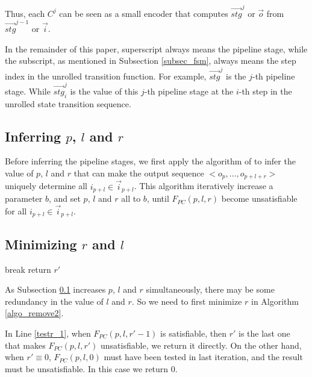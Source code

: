 \documentclass[runningheads,a4paper,orivec]{llncs}
\begin{document}
Thus,
each $C^j$ can be seen as a small encoder that computes $\vec{stg}^j$ or $\vec{o}$
from $\vec{stg}^{j-1}$ or $\vec{i}$.

In the remainder of this paper,
superscript always means the pipeline stage,
while the subscript,
as mentioned in Subsection \ref{subsec_fsm},
always means the step index in the unrolled transition function.
For example,
$\vec{stg}^j$ is the $j$-th pipeline stage.
While $\vec{stg}^j_i$ is the value of this $j$-th pipeline stage 
at the $i$-th step in the unrolled state transition sequence.

\subsection{Inferring $p$, $l$ and $r$}\label{subsec_inferplr}
Before inferring the pipeline stages,
we first apply the algorithm of \cite{ShenTCAD11} to infer the value of $p$, $l$ and $r$ that can make the 
output sequence $<o_{p},\dots,o_{p+l+r}>$ uniquely determine all $i_{p+l}\in \vec{i}_{p+l}$.
This algorithm iteratively increase a parameter $b$,
and set $p$, $l$ and $r$ all to $b$,
until $F_{PC}(p,l,r)$ become unsatisfiable for all $i_{p+l}\in \vec{i}_{p+l}$.

\subsection{Minimizing $r$ and $l$}\label{reduceing}

\begin{algorithm}[t]
\SetAlgoVlined
{} {
   {
    break
  }
}
return $r'$
\caption{$RemoveRedundancy(p,l,r)$}
\label{algo_remove2}
\end{algorithm}

As Subsection \ref{subsec_inferplr} increases $p$, $l$ and $r$ simultaneously,
there may be some redundancy in the value of $l$ and $r$.
So we need to first minimize $r$ in Algorithm \ref{algo_remove2}.


In Line \ref{testr_1},
when $F_{PC}(p,l,r'-1)$ is satisfiable,
then $r'$ is the last one that makes $F_{PC}(p,l,r')$ unsatisfiable,
we return it directly.
On the other hand,
when $r'\equiv 0$,
$F_{PC}(p,l,0)$ must have been tested in last iteration,
and the result must be unsatisfiable.
In this case we return $0$.
\end{document}
